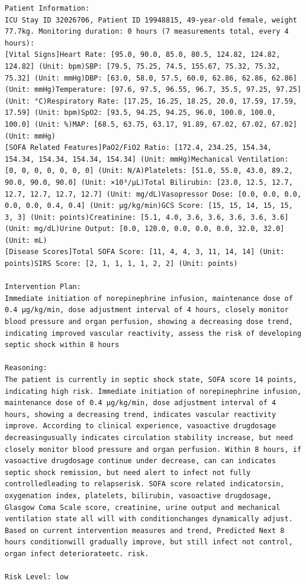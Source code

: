 \documentclass{article}
\begin{document}
\begin{lstlisting}[caption={Result for Patient 32026706}, label={lst:32026706}]
Patient Information:
ICU Stay ID 32026706, Patient ID 19948815, 49-year-old female, weight 77.7kg. Monitoring duration: 0 hours (7 measurements total, every 4 hours):
[Vital Signs]Heart Rate: [95.0, 90.0, 85.0, 80.5, 124.82, 124.82, 124.82] (Unit: bpm)SBP: [79.5, 75.25, 74.5, 155.67, 75.32, 75.32, 75.32] (Unit: mmHg)DBP: [63.0, 58.0, 57.5, 60.0, 62.86, 62.86, 62.86] (Unit: mmHg)Temperature: [97.6, 97.5, 96.55, 96.7, 35.5, 97.25, 97.25] (Unit: °C)Respiratory Rate: [17.25, 16.25, 18.25, 20.0, 17.59, 17.59, 17.59] (Unit: bpm)SpO2: [93.5, 94.25, 94.25, 96.0, 100.0, 100.0, 100.0] (Unit: %)MAP: [68.5, 63.75, 63.17, 91.89, 67.02, 67.02, 67.02] (Unit: mmHg)
[SOFA Related Features]PaO2/FiO2 Ratio: [172.4, 234.25, 154.34, 154.34, 154.34, 154.34, 154.34] (Unit: mmHg)Mechanical Ventilation: [0, 0, 0, 0, 0, 0, 0] (Unit: N/A)Platelets: [51.0, 55.0, 43.0, 89.2, 90.0, 90.0, 90.0] (Unit: ×10³/μL)Total Bilirubin: [23.0, 12.5, 12.7, 12.7, 12.7, 12.7, 12.7] (Unit: mg/dL)Vasopressor Dose: [0.0, 0.0, 0.0, 0.0, 0.0, 0.4, 0.4] (Unit: μg/kg/min)GCS Score: [15, 15, 14, 15, 15, 3, 3] (Unit: points)Creatinine: [5.1, 4.0, 3.6, 3.6, 3.6, 3.6, 3.6] (Unit: mg/dL)Urine Output: [0.0, 120.0, 0.0, 0.0, 0.0, 32.0, 32.0] (Unit: mL)
[Disease Scores]Total SOFA Score: [11, 4, 4, 3, 11, 14, 14] (Unit: points)SIRS Score: [2, 1, 1, 1, 1, 2, 2] (Unit: points)

Intervention Plan:
Immediate initiation of norepinephrine infusion, maintenance dose of 0.4 μg/kg/min, dose adjustment interval of 4 hours, closely monitor blood pressure and organ perfusion, showing a decreasing dose trend, indicating improved vascular reactivity, assess the risk of developing septic shock within 8 hours

Reasoning:
The patient is currently in septic shock state, SOFA score 14 points, indicating high risk. Immediate initiation of norepinephrine infusion, maintenance dose of 0.4 μg/kg/min, dose adjustment interval of 4 hours, showing a decreasing trend, indicates vascular reactivity improve. According to clinical experience, vasoactive drugdosage decreasingusually indicates circulation stability increase, but need closely monitor blood pressure and organ perfusion. Within 8 hours, if vasoactive drugdosage continue under decrease, can can indicates septic shock remission, but need alert to infect not fully controlledleading to relapserisk. SOFA score related indicatorsin, oxygenation index, platelets, bilirubin, vasoactive drugdosage, Glasgow Coma Scale score, creatinine, urine output and mechanical ventilation state all will with conditionchanges dynamically adjust. Based on current intervention measures and trend, Predicted Next 8 hours conditionwill gradually improve, but still infect not control, organ infect deteriorateetc. risk.

Risk Level: low
\end{lstlisting}
\end{document}
